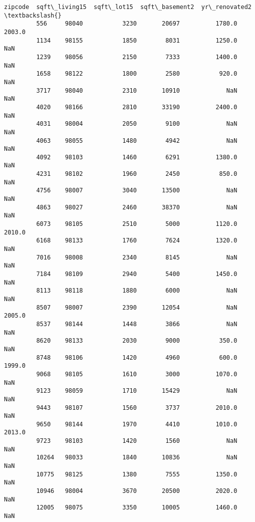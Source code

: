 \documentclass[11pt]{article}
\begin{document}
\begin{Verbatim}[commandchars=\\\{\}]
               zipcode  sqft\_living15  sqft\_lot15  sqft\_basement2  yr\_renovated2  \textbackslash{}
         556     98040           3230       20697          1780.0         2003.0   
         1134    98155           1850        8031          1250.0            NaN   
         1239    98056           2150        7333          1400.0            NaN   
         1658    98122           1800        2580           920.0            NaN   
         3717    98040           2310       10910             NaN            NaN   
         4020    98166           2810       33190          2400.0            NaN   
         4031    98004           2050        9100             NaN            NaN   
         4063    98055           1480        4942             NaN            NaN   
         4092    98103           1460        6291          1380.0            NaN   
         4231    98102           1960        2450           850.0            NaN   
         4756    98007           3040       13500             NaN            NaN   
         4863    98027           2460       38370             NaN            NaN   
         6073    98105           2510        5000          1120.0         2010.0   
         6168    98133           1760        7624          1320.0            NaN   
         7016    98008           2340        8145             NaN            NaN   
         7184    98109           2940        5400          1450.0            NaN   
         8113    98118           1880        6000             NaN            NaN   
         8507    98007           2390       12054             NaN         2005.0   
         8537    98144           1448        3866             NaN            NaN   
         8620    98133           2030        9000           350.0            NaN   
         8748    98106           1420        4960           600.0         1999.0   
         9068    98105           1610        3000          1070.0            NaN   
         9123    98059           1710       15429             NaN            NaN   
         9443    98107           1560        3737          2010.0            NaN   
         9650    98144           1970        4410          1010.0         2013.0   
         9723    98103           1420        1560             NaN            NaN   
         10264   98033           1840       10836             NaN            NaN   
         10775   98125           1380        7555          1350.0            NaN   
         10946   98004           3670       20500          2020.0            NaN   
         12005   98075           3350       10005          1460.0            NaN   

\end{Verbatim}
\end{document}
